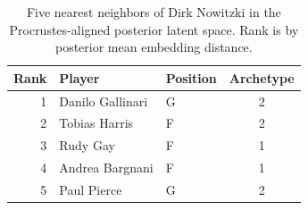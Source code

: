 \begin{table}[htbp]
  \centering\small
  \begin{tabular}{rllc}
    \toprule
    Rank & Player & Position & Archetype \\
    \midrule
    1 & Danilo Gallinari & G & 2 \\
    2 & Tobias Harris & F & 2 \\
    3 & Rudy Gay & F & 1 \\
    4 & Andrea Bargnani & F & 1 \\
    5 & Paul Pierce & G & 2 \\
    \bottomrule
  \end{tabular}
  \caption{Five nearest neighbors of Dirk Nowitzki in the Procrustes-aligned posterior latent space. Rank is by posterior mean embedding distance.}
  \label{tab:Dirk_Nowitzki_neighbors}
\end{table}

